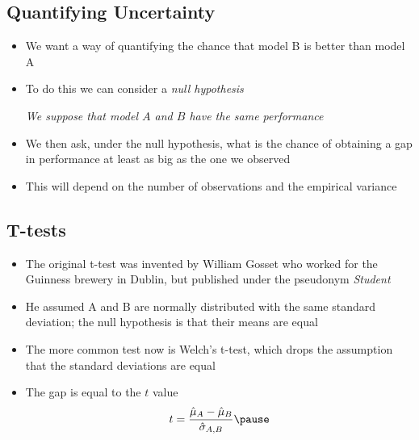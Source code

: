 
\begin{slide}
\section{Quantifying Uncertainty}

\begin{PauseHighLight}
  \begin{itemize}
  \item We want a way of quantifying the chance that model B is better
    than model A\pause
  \item To do this we can consider a \emph{null hypothesis}
    \begin{center}
      \textit{We suppose that model $A$ and $B$ have the same performance}\pause
    \end{center}
  \item We then ask, under the null hypothesis, what is the chance of obtaining a gap in
    performance at least as big as the one we observed\pause
  \item This will depend on the number of observations and the
    empirical variance\pause
  \end{itemize}
\end{PauseHighLight}

\end{slide}


\begin{slide}
\section[-2]{T-tests}

\begin{PauseHighLight}
  \begin{itemize}
  \item The original t-test was invented by William Gosset who worked
    for the Guinness brewery in Dublin, but published under the
    pseudonym \textit{Student}\pause
  \item He assumed A and B are normally distributed with the same
    standard deviation; the null hypothesis is that their means are
    equal\pause
  \item The more common test now is Welch's t-test, which drops the
    assumption that the standard deviations are equal\pause
  \item The gap is equal to the $t$ value
    \begin{align*}
      t = \frac{\hat{\mu}_A - \hat{\mu}_B}{\hat{\sigma}_{A,B}}\pause
    \end{align*}
  \end{itemize} 
\end{PauseHighLight}

\end{slide}

